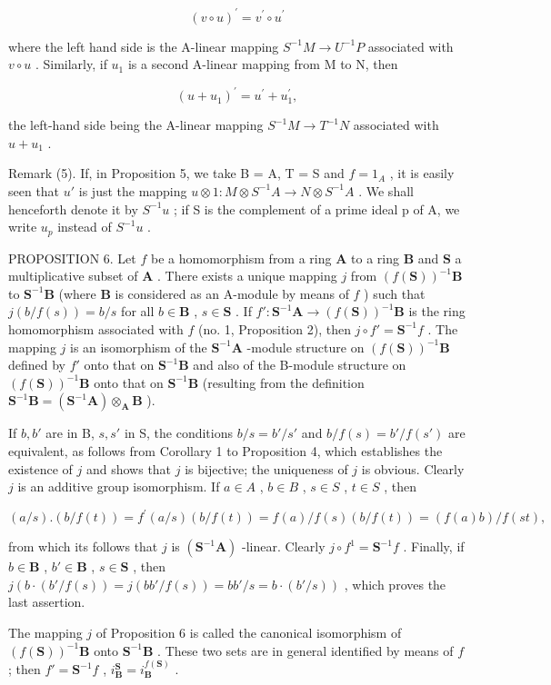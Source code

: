 \[
(v \circ u) ^ {\prime} = v ^ {\prime} \circ u ^ {\prime}\tag{7}
\]

where the left hand side is the A-linear mapping \(S^{-1}M \rightarrow U^{-1}P\) associated with \(v \circ u\) . Similarly, if \(u_{1}\) is a second A-linear mapping from M to N, then

\[
(u + u _ {1}) ^ {\prime} = u ^ {\prime} + u _ {1} ^ {\prime},\tag{8}
\]

the left-hand side being the A-linear mapping \(S^{-1}M \rightarrow T^{-1}N\) associated with \(u + u_{1}\) .

Remark (5). If, in Proposition 5, we take B = A, T = S and \(f = 1_{A}\) , it is easily seen that \(u'\) is just the mapping \(u \otimes 1: M \otimes S^{-1}A \to N \otimes S^{-1}A\) . We shall henceforth denote it by \(S^{-1}u\) ; if S is the complement of a prime ideal p of A, we write \(u_{p}\) instead of \(S^{-1}u\) .

PROPOSITION 6. Let \(f\) be a homomorphism from a ring \(\mathbf{A}\) to a ring \(\mathbf{B}\) and \(\mathbf{S}\) a multiplicative subset of \(\mathbf{A}\) . There exists a unique mapping \(j\) from \((f(\mathbf{S}))^{-1}\mathbf{B}\) to \(\mathbf{S}^{-1}\mathbf{B}\) (where \(\mathbf{B}\) is considered as an A-module by means of \(f\) ) such that \(j(b/f(s)) = b/s\) for all \(b \in \mathbf{B}\) , \(s \in \mathbf{S}\) . If \(f': \mathbf{S}^{-1}\mathbf{A} \to (f(\mathbf{S}))^{-1}\mathbf{B}\) is the ring homomorphism associated with \(f\) (no. 1, Proposition 2), then \(j \circ f' = \mathbf{S}^{-1}f\) . The mapping \(j\) is an isomorphism of the \(\mathbf{S}^{-1}\mathbf{A}\) -module structure on \((f(\mathbf{S}))^{-1}\mathbf{B}\) defined by \(f'\) onto that on \(\mathbf{S}^{-1}\mathbf{B}\) and also of the B-module structure on \((f(\mathbf{S}))^{-1}\mathbf{B}\) onto that on \(\mathbf{S}^{-1}\mathbf{B}\) (resulting from the definition \(\mathbf{S}^{-1}\mathbf{B} = (\mathbf{S}^{-1}\mathbf{A}) \otimes_{\mathbf{A}} \mathbf{B}\) ).

If \(b, b'\) are in B, \(s, s'\) in S, the conditions \(b / s = b' / s'\) and \(b / f(s) = b' / f(s')\) are equivalent, as follows from Corollary 1 to Proposition 4, which establishes the existence of \(j\) and shows that \(j\) is bijective; the uniqueness of \(j\) is obvious. Clearly \(j\) is an additive group isomorphism. If \(a \in A\) , \(b \in B\) , \(s \in S\) , \(t \in S\) , then

\[
(a / s). (b / f (t)) = f ^ {\prime} (a / s) (b / f (t)) = f (a) / f (s) (b / f (t)) = (f (a) b) / f (s t),
\]

from which its follows that \(j\) is \((\mathbf{S}^{-1}\mathbf{A})\) -linear. Clearly \(j \circ f^1 = \mathbf{S}^{-1}f\) . Finally, if \(b \in \mathbf{B}\) , \(b' \in \mathbf{B}\) , \(s \in \mathbf{S}\) , then \(j(b \cdot (b'/f(s)) = j(bb'/f(s)) = bb'/s = b \cdot (b'/s))\) , which proves the last assertion.

The mapping \(j\) of Proposition 6 is called the canonical isomorphism of \((f(\mathbf{S}))^{-1}\mathbf{B}\) onto \(\mathbf{S}^{-1}\mathbf{B}\) . These two sets are in general identified by means of \(f\) ; then \(f' = \mathbf{S}^{-1}f\) , \(i_{\mathbf{B}}^{\mathbf{S}} = i_{\mathbf{B}}^{f(\mathbf{S})}\) .

